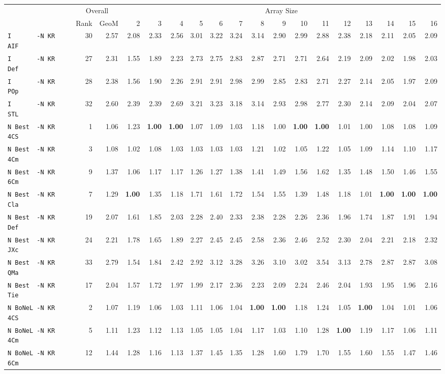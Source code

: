 \begin{tabular}{l | r r | r r r r r r r r r r r r r r r |}
 & \multicolumn{2}{c}{Overall} & \multicolumn{15}{c}{Array Size} \\
 & Rank & GeoM & 2&3&4&5&6&7&8&9&10&11&12&13&14&15&16\\ \hline
\verb+I       -N KR AIF+ & 30 & 2.57 & 2.08&2.33&2.56&3.01&3.22&3.24&3.14&2.90&2.99&2.88&2.38&2.18&2.11&2.05&2.09\\
\verb+I       -N KR Def+ & 27 & 2.31 & 1.55&1.89&2.23&2.73&2.75&2.83&2.87&2.71&2.71&2.64&2.19&2.09&2.02&1.98&2.03\\
\verb+I       -N KR POp+ & 28 & 2.38 & 1.56&1.90&2.26&2.91&2.91&2.98&2.99&2.85&2.83&2.71&2.27&2.14&2.05&1.97&2.09\\
\verb+I       -N KR STL+ & 32 & 2.60 & 2.39&2.39&2.69&3.21&3.23&3.18&3.14&2.93&2.98&2.77&2.30&2.14&2.09&2.04&2.07\\
\verb+N Best  -N KR 4CS+ & 1 & 1.06 & 1.23&\textbf{1.00}&\textbf{1.00}&1.07&1.09&1.03&1.18&1.00&\textbf{1.00}&\textbf{1.00}&1.01&1.00&1.08&1.08&1.09\\
\verb+N Best  -N KR 4Cm+ & 3 & 1.08 & 1.02&1.08&1.03&1.03&1.03&1.03&1.21&1.02&1.05&1.22&1.05&1.09&1.14&1.10&1.17\\
\verb+N Best  -N KR 6Cm+ & 9 & 1.37 & 1.06&1.17&1.17&1.26&1.27&1.38&1.41&1.49&1.56&1.62&1.35&1.48&1.50&1.46&1.55\\
\verb+N Best  -N KR Cla+ & 7 & 1.29 & \textbf{1.00}&1.35&1.18&1.71&1.61&1.72&1.54&1.55&1.39&1.48&1.18&1.01&\textbf{1.00}&\textbf{1.00}&\textbf{1.00}\\
\verb+N Best  -N KR Def+ & 19 & 2.07 & 1.61&1.85&2.03&2.28&2.40&2.33&2.38&2.28&2.26&2.36&1.96&1.74&1.87&1.91&1.94\\
\verb+N Best  -N KR JXc+ & 24 & 2.21 & 1.78&1.65&1.89&2.27&2.45&2.45&2.58&2.36&2.46&2.52&2.30&2.04&2.21&2.18&2.32\\
\verb+N Best  -N KR QMa+ & 33 & 2.79 & 1.54&1.84&2.42&2.92&3.12&3.28&3.26&3.10&3.02&3.54&3.13&2.78&2.87&2.87&3.08\\
\verb+N Best  -N KR Tie+ & 17 & 2.04 & 1.57&1.72&1.97&1.99&2.17&2.36&2.23&2.09&2.24&2.46&2.04&1.93&1.95&1.96&2.16\\
\verb+N BoNeL -N KR 4CS+ & 2 & 1.07 & 1.19&1.06&1.03&1.11&1.06&1.04&\textbf{1.00}&\textbf{1.00}&1.18&1.24&1.05&\textbf{1.00}&1.04&1.01&1.06\\
\verb+N BoNeL -N KR 4Cm+ & 5 & 1.11 & 1.23&1.12&1.13&1.05&1.05&1.04&1.17&1.03&1.10&1.28&\textbf{1.00}&1.19&1.17&1.06&1.11\\
\verb+N BoNeL -N KR 6Cm+ & 12 & 1.44 & 1.28&1.16&1.13&1.37&1.45&1.35&1.28&1.60&1.79&1.70&1.55&1.60&1.55&1.47&1.46\\

\end{tabular}
